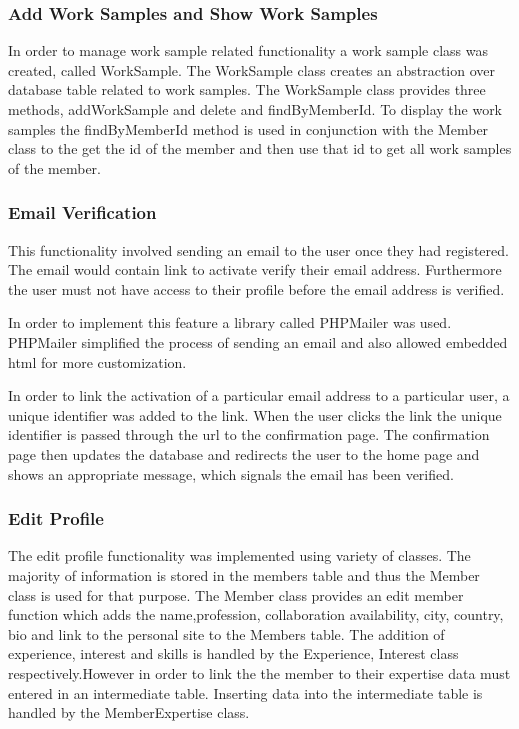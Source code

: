 \documentclass[a4paper,oneside,11pt]{report}
\begin{document}
\pagebreak
\subsubsection{Add Work Samples and Show Work Samples}
In order to manage work sample related functionality a work sample class was created, called WorkSample. The WorkSample class creates an abstraction over database table related to work samples. The WorkSample class provides three methods, addWorkSample and delete and findByMemberId. To display the work samples the findByMemberId method is used in conjunction with the Member class to the get the id of the member and then use that id to get all work samples of the member.

\subsubsection{Email Verification}
This functionality involved sending an email to the user once they had registered. The email would contain link to activate verify their email address. Furthermore the user must not have access to their profile before the email address is verified.

In order to implement this feature a library called PHPMailer was used. PHPMailer simplified the process of sending an email and also allowed embedded html for more customization.

In order to link the activation of a particular email address to a particular user, a unique identifier was added to the link. When the user clicks the link the unique identifier is passed through the url to the confirmation page. The confirmation page then updates the database and redirects the user to the home page and shows an appropriate message, which signals the email has been verified.

\subsubsection{Edit Profile}
The edit profile functionality was implemented using variety of classes. The majority of information is stored in the members table and thus the Member class is used for that purpose. The Member class provides an edit member function which adds the name,profession, collaboration availability, city, country, bio and link to the personal site to the Members table. The addition of experience, interest and skills is handled by the Experience, Interest class respectively.However in order to link the the member to their expertise data must entered in an intermediate table. Inserting data into the intermediate table is handled by the MemberExpertise class.
\end{document}
